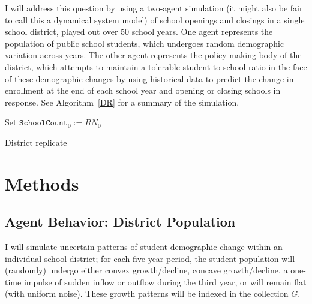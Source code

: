 \documentclass{article}
\begin{document}
I will address this question by using a two-agent simulation (it might also be fair to call this a dynamical system model) of school openings and closings in a single school district, played out over 50 school years. One agent represents the population of public school students, which undergoes random demographic variation across years. The other agent represents the policy-making body of the district, which attempts to maintain a tolerable student-to-school ratio in the face of these demographic changes by using historical data to predict the change in enrollment at the end of each school year and opening or closing schools in response.
See Algorithm~\ref{DR} for a summary of the simulation.
\begin{algorithm}
\SetAlgoLined
{}
Set $\texttt{SchoolCount}_0  := RN_0$ \\
\caption{District replicate\label{DR}}
\end{algorithm}

\section*{Methods}


\subsection*{Agent Behavior: District Population}
I will simulate uncertain patterns of student demographic change within an individual school district; for each five-year period, the student population will (randomly) undergo either convex growth/decline, concave growth/decline, a one-time impulse of sudden inflow or outflow during the third year, or will remain flat (with uniform noise). These growth patterns will be indexed in the collection $G$.
\end{document}
